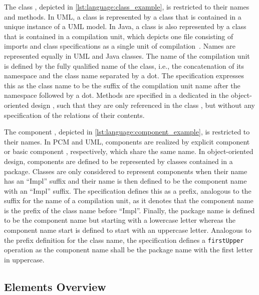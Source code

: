 The class \commonality, depicted in \autoref{lst:language:class_example}, is restricted to their names and methods.
In \gls{UML}, a class is represented by a class that is contained in a unique instance of a \gls{UML} model.
In Java, a class is also represented by a class that is contained in a compilation unit, which depicts one file consisting of imports and class specifications as a single unit of compilation~\cite{heidenreich2009jamopp-report}.
Names are represented equally in \gls{UML} and Java classes.
The name of the compilation unit is defined by the fully qualified name of the class, i.e., the concatenation of its namespace and the class name separated by a dot.
The specification expresses this as the class name to be the suffix of the compilation unit name after the namespace followed by a dot.
Methods are specified in a dedicated \commonality in the object-oriented design \conceptmetamodel, such that they are only referenced in the class \commonality, but without any specification of the relations of their contents.

The component \commonality, depicted in \autoref{lst:language:component_example}, is restricted to their names.
In \gls{PCM} and \gls{UML}, components are realized by explicit component or basic component \metaclasses, respectively, which share the same name.
In object-oriented design, components are defined to be represented by classes contained in a package.
Classes are only considered to represent components when their name has an \enquote{Impl} suffix and their name is then defined to be the component name with an \enquote{Impl} suffix.
The specification defines this as a prefix, analogous to the suffix for the name of a compilation unit, as it denotes that the component name is the prefix of the class name before \enquote{Impl}.
Finally, the package name is defined to be the component name but starting with a lowercase letter whereas the component name start is defined to start with an uppercase letter.
Analogous to the prefix definition for the class name, the specification defines a \texttt{firstUpper} operation as the component name shall be the package name with the first letter in uppercase.


\subsection{Elements Overview}

